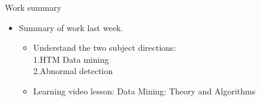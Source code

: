 \documentclass[
 size=14pt,
 paper=smartboard,  %
 mode=present, 		%
 display=slides, 	%
 style=tuliplab,  	%
 pauseslide,
 fleqn,leqno]{powerdot}
\newcommand\twotonebox[2]{\fcolorbox{pdcolor2}{pdcolor2}
{#1\vphantom{#2}}\fcolorbox{pdcolor2}{white}{#2\vphantom{#1}}}
\begin{document}
\begin{slide}{Work summary}

  \begin{itemize}
    \item Summary of work last week.\\  
    \begin{itemize}
      \item Understand the two subject directions:\\
            1.HTM Data mining\\
            2.Abnormal detection\\
      \item Learning video lesson: Data Mining: Theory and Algorithms\\
    \end{itemize}
  \end{itemize}






\end{slide}
\end{document}
